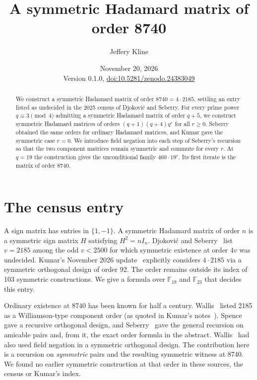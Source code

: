 \documentclass[11pt,letterpaper]{article}
\title{A symmetric Hadamard matrix of order 8740}
\author{Jeffery Kline}
\date{November 20, 2026\\[3pt]\small Version 0.1.0, \href{https://doi.org/10.5281/zenodo.24383049}{doi:10.5281/zenodo.24383049}}
\newcommand{\F}{\mathbb F}
\begin{document}
\maketitle
\begin{abstract}
We construct a symmetric Hadamard matrix of order \(8740=4\cdot2185\), settling an entry listed as undecided in the 2025 census of Djokovi\'c and Seberry. For every prime power \(q\equiv3\pmod4\) admitting a symmetric Hadamard matrix of order \(q+5\), we construct symmetric Hadamard matrices of orders \((q+1)(q+4)q^r\) for all \(r\geq0\). Seberry obtained the same orders for ordinary Hadamard matrices, and Kumar gave the symmetric case \(r=0\). We introduce field negation into each step of Seberry's recursion so that the two component matrices remain symmetric and commute for every \(r\). At \(q=19\) the construction gives the unconditional family \(460\cdot19^r\). Its first iterate is the matrix of order 8740.
\end{abstract}

\section{The census entry}
A sign matrix has entries in \(\{1,-1\}\). A symmetric Hadamard matrix of order \(n\) is a symmetric sign matrix \(H\) satisfying \(H^2=nI_n\). Djokovi\'c and Seberry~\cite[Section~2]{census} list \(v=2185\) among the odd \(v<2500\) for which symmetric existence at order \(4v\) was undecided. Kumar's November 2026 update~\cite{kumar} explicitly considers \(4\cdot2185\) via a symmetric orthogonal design of order 92. The order remains outside its index of 103 symmetric constructions. We give a formula over \(\F_{19}\) and \(\F_{23}\) that decides this entry.

Ordinary existence at 8740 has been known for half a century. Wallis~\cite[Corollary~4]{williamson} listed 2185 as a Williamson-type component order (as quoted in Kumar's notes~\cite{kumar}). Spence~\cite[Theorems~6 and~10]{spence} gave a recursive orthogonal design, and Seberry~\cite[Theorem~1 and Corollary~2(b)]{seberry} gave the general recursion on amicable pairs and, from it, the exact order formula in the abstract. Wallis~\cite[proof of Theorem~1]{reverse} had also used field negation in a symmetric orthogonal design. The contribution here is a recursion on \emph{symmetric} pairs and the resulting symmetric witness at 8740. We found no earlier symmetric construction at that order in these sources, the census or Kumar's index.
\end{document}
